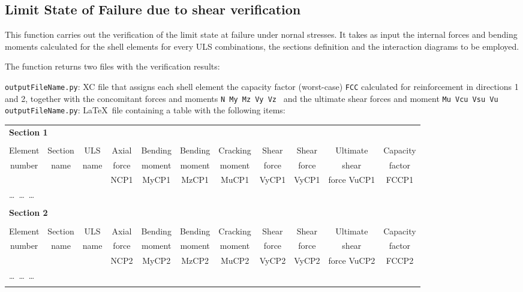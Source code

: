 \subsection{Limit State of Failure due to shear verification}
This function carries out the verification of the limit state at failure under nornal stresses. It takes as input the internal forces and bending moments calculated for the shell elements for every ULS combinations, the sections definition and the interaction diagrams to be employed.

The function returns two files with the verification results:

{\tt outputFileName.py}: XC file that assigns each shell element the capacity factor (worst-case) {\tt FCC} calculated for reinforcement in directions 1 and 2, together with the concomitant forces and moments {\tt N My Mz  Vy Vz } and the ultimate shear forces and moment {\tt Mu Vcu Vsu Vu }
{\tt outputFileName.py}: \LaTeX\  file containing a table with the following items:

\begin{footnotesize}
\begin{center}
\begin{tabular}{ccccccccccc}
\multicolumn{7}{l}{\textbf{Section 1}} \\
\\
Element & Section & ULS  & Axial      & Bending      & Bending      & Cracking       & Shear       & Shear       & Ultimate & Capacity \\
number  & name    & name & force      & moment       & moment       & moment & force       & force       & shear    & factor       \\
        &         &      &       NCP1 &        MyCP1 &        MzCP1 & MuCP1          &       VyCP1 &       VyCP1 & force VuCP1 & FCCP1 \\
\hline
\multicolumn{7}{l}{\ldots\ \ldots\ \ldots} \\
\\
\multicolumn{7}{l}{\textbf{Section 2}} \\
\\
Element & Section & ULS  & Axial      & Bending      & Bending      & Cracking       & Shear       & Shear       & Ultimate & Capacity \\
number  & name    & name & force      & moment       & moment       & moment & force       & force       & shear    & factor       \\
        &         &      &       NCP2 &        MyCP2 &        MzCP2 & MuCP2          &       VyCP2 &       VyCP2 & force VuCP2 &       FCCP2 \\


\hline
\multicolumn{7}{l}{\ldots\ \ldots\ \ldots} \\
\\

\end{tabular}
\end{center}
\end{footnotesize}


